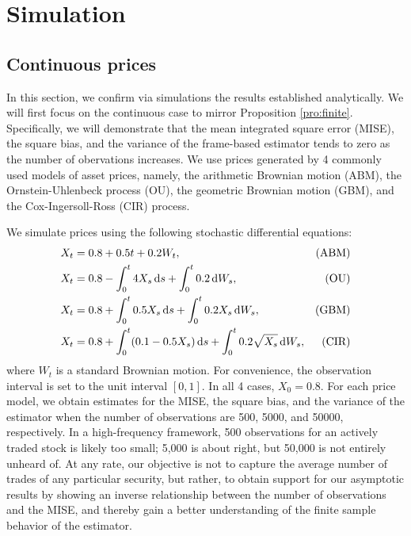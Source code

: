 \section{Simulation}\label{sec:simulation}
\subsection{Continuous prices}
In this section, we  confirm via simulations the results established analytically. We will first focus on the continuous case to mirror   Proposition \eqref{pro:finite}.  Specifically, we will demonstrate that the mean integrated square error (MISE), the square bias, and the variance of the frame-based estimator tends to zero as the number of obervations increases.  We use prices generated by 4 commonly used models of asset prices, namely, the  arithmetic Brownian motion (ABM),  the Ornstein-Uhlenbeck process (OU), the geometric Brownian motion (GBM), and the Cox-Ingersoll-Ross (CIR) process. 

We simulate prices using the following stochastic differential equations:
\begin{align}
  & X_t = 0.8 +  0.5  t + 0.2  W_t,\notag & \text{(ABM)}\\
  & X_t = 0.8 -\int_0^t 4 X_s \D s + \int^t_0 0.2 \D W_s,\notag & \text{(OU)}\\
  & X_t = 0.8 + \int_0^t 0.5 X_s \D s + \int^t_0 0.2 X_s \D W_s,\notag & \text{(GBM)}\\
  & X_t = 0.8 + \int_0^t(0.1 - 0.5 X_s) \D s +\int^t_0  0.2 \sqrt{X_s} \D W_s,\notag & \text{(CIR)}
  \label{}
\end{align}
where $W_t$ is a standard Brownian motion. For convenience, the observation interval is set to the unit interval $[0,1]$. In all 4 cases, $X_0 = 0.8$. For each price model, we obtain estimates for the MISE, the square bias, and the variance of the estimator  when the number of  observations are 500, 5000, and 50000, respectively. In a high-frequency framework, 500 observations for an actively traded stock is likely too small; 5,000 is about right, but 50,000 is not entirely unheard of. At any rate, our objective is not to capture the average number of trades of any particular security, but rather,  to obtain support for our asymptotic results by showing an inverse relationship between the number of observations and the MISE, and thereby gain a better understanding of the finite sample behavior of the estimator.

